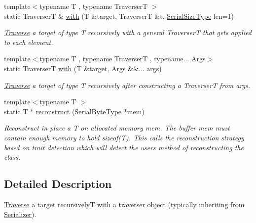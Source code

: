 \begin{DoxyCompactItemize}
\item 
{\footnotesize template$<$typename T , typename TraverserT $>$ }\\static TraverserT \& \hyperlink{structcheckpoint_1_1dispatch_1_1_traverse_a179ea8a80a3cf9a50091b70da785eb83}{with} (T \&target, TraverserT \&t, \hyperlink{namespacecheckpoint_a083f6674da3f94c2901b18c6d238217c}{Serial\+Size\+Type} len=1)
\begin{DoxyCompactList}\small\item\em \hyperlink{structcheckpoint_1_1dispatch_1_1_traverse}{Traverse} a {\ttfamily target} of type {\ttfamily T} recursively with a general {\ttfamily TraverserT} that gets applied to each element. \end{DoxyCompactList}\item 
{\footnotesize template$<$typename T , typename TraverserT , typename... Args$>$ }\\static TraverserT \hyperlink{structcheckpoint_1_1dispatch_1_1_traverse_a52e345aa5da6b8d7866a15993356788c}{with} (T \&target, Args \&\&... args)
\begin{DoxyCompactList}\small\item\em \hyperlink{structcheckpoint_1_1dispatch_1_1_traverse}{Traverse} a {\ttfamily target} of type {\ttfamily T} recursively after constructing a {\ttfamily TraverserT} from {\ttfamily args}. \end{DoxyCompactList}\item 
{\footnotesize template$<$typename T $>$ }\\static T $\ast$ \hyperlink{structcheckpoint_1_1dispatch_1_1_traverse_ad043c9e132aeb99049d0d3ff8df6b876}{reconstruct} (\hyperlink{namespacecheckpoint_ae57f01cdc0b81776c23b6c7c934c58f5}{Serial\+Byte\+Type} $\ast$mem)
\begin{DoxyCompactList}\small\item\em Reconstruct in place a {\ttfamily T} on allocated memory {\ttfamily mem}. The buffer {\ttfamily mem} must contain enough memory to hold {\ttfamily sizeof(\+T)}. This calls the reconstruction strategy based on trait detection which will detect the user\textquotesingle{}s method of reconstructing the class. \end{DoxyCompactList}\end{DoxyCompactItemize}


\subsection{Detailed Description}
\hyperlink{structcheckpoint_1_1dispatch_1_1_traverse}{Traverse} a target recursively{\ttfamily T} with a traverser object (typically inheriting from {\ttfamily \hyperlink{structcheckpoint_1_1_serializer}{Serializer}}). 

